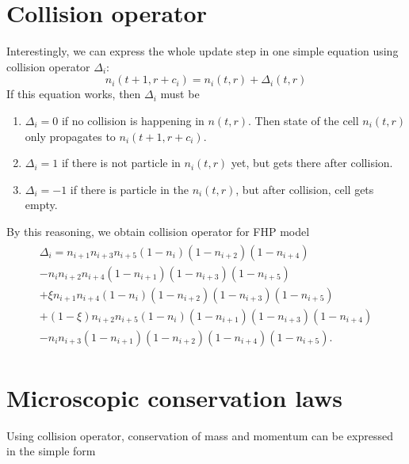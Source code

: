 \section{Collision operator}
Interestingly, we can express the whole update step in one simple equation using collision operator $\Delta_i$:
\begin{equation*}
n_i(t+1,r+c_i) = n_i(t,r) + \Delta_i(t,r)
\end{equation*}
If this equation works, then $\Delta_i$ must be
\begin{enumerate}
\item $\Delta_i = 0$ if no collision is happening in $n(t,r)$. Then state of the cell $n_i(t,r)$ only propagates to $n_i(t+1,r+c_i)$.
\item $\Delta_i = 1$ if there is not particle in $n_i(t,r)$ yet, but gets there after collision. 
 \item $\Delta_i = -1$ if there is particle in the $n_i(t,r)$, but after collision, cell gets empty.
\end{enumerate}

\bigskip
%

By this reasoning, we obtain collision operator for FHP model
\begin{align} \label{colop}
\begin{split}
\Delta_i = n_{i+1}n_{i+3}n_{i+5}(1-n_i)(1-n_{i+2})(1-n_{i+4})\\
-n_in_{i+2}n_{i+4}(1-n_{i+1})(1-n_{i+3})(1-n_{i+5})\\
 + \xi n_{i+1}n_{i+4}(1-n_i)(1-n_{i+2})(1-n_{i+3})(1-n_{i+5})\\
 +(1-\xi)n_{i+2}n_{i+5}(1-n_i)(1-n_{i+1})(1-n_{i+3})(1-n_{i+4})\\
 -n_in_{i+3}(1-n_{i+1})(1-n_{i+2})(1-n_{i+4})(1-n_{i+5}).
\end{split}
\end{align}

\section{Microscopic conservation laws}
Using collision operator, conservation of mass and momentum can be expressed in the simple form

